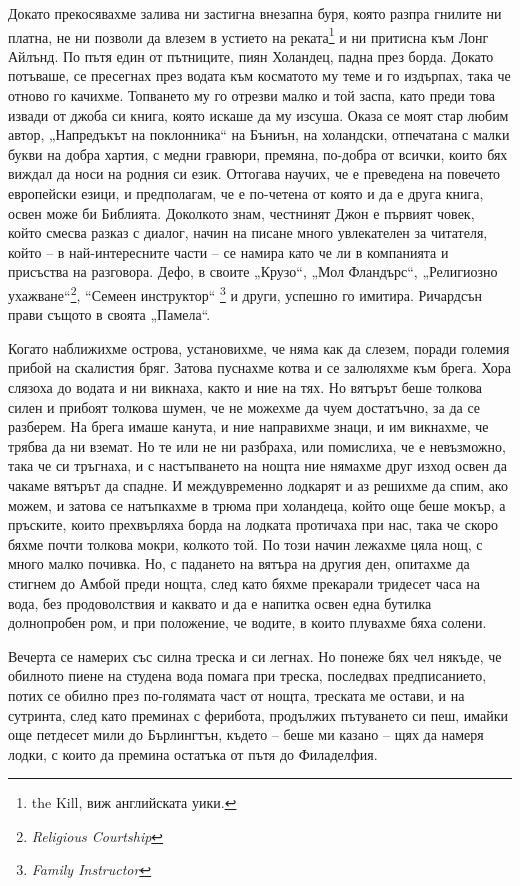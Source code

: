 \documentclass[12pt]{book}
\begin{document}
Докато прекосявахме залива ни застигна внезапна буря, която разпра гнилите ни платна, не ни позволи да влезем в устието на реката\footnote{the Kill, виж английската уики.} и ни притисна към Лонг Айлънд. По пътя един от пътниците, пиян Холандец, падна през борда. Докато потъваше, се пресегнах през водата към косматото му теме и го издърпах, така че отново го качихме. Топването му го отрезви малко и той заспа, като преди това извади от джоба си книга, която искаше да му изсуша. Оказа се моят стар любим автор, „Напредъкът на поклонника“ на Бъниън, на холандски, отпечатана с малки букви на добра хартия, с медни гравюри, премяна, по-добра от всички, които бях виждал да носи на родния си език. Оттогава научих, че е преведена на повечето европейски езици, и предполагам, че е по-четена от която и да е друга книга, освен може би Библията. Доколкото знам, честнинят Джон е първият човек, който смесва разказ с диалог, начин на писане много увлекателен за читателя, който – в най-интересните части – се намира като че ли в компанията и присъства на разговора. Дефо, в своите „Крузо“, „Мол Фландърс“, „Религиозно ухажване“\footnote{\textit{Religious Courtship}}, “Семеен инструктор“ \footnote{\textit{Family Instructor}} и други, успешно го имитира. Ричардсън прави същото в своята „Памела“.

Когато наближихме острова, установихме, че няма как да слезем, поради големия прибой на скалистия бряг. Затова пуснахме котва и се залюляхме към брега. Хора слязоха до водата и ни викнаха, както и ние на тях. Но вятърът беше толкова силен и прибоят толкова шумен, че не можехме да чуем достатъчно, за да се разберем. На брега имаше канута, и ние направихме знаци, и им викнахме, че трябва да ни вземат. Но те или не ни разбраха, или помислиха, че е невъзможно, така че си тръгнаха, и с настъпването на нощта ние нямахме друг изход освен да чакаме вятърът да спадне. И междувременно лодкарят и аз решихме да спим, ако можем, и затова се натъпкахме в трюма при холандеца, който още беше мокър, а пръските, които прехвърляха борда на лодката протичаха при нас, така че скоро бяхме почти толкова мокри, колкото той. По този начин лежахме цяла нощ, с много малко почивка. Но, с падането на вятъра на другия ден, опитахме да стигнем до Амбой преди нощта, след като бяхме прекарали тридесет часа на вода, без продоволствия и каквато и да е напитка освен една бутилка долнопробен ром, и при положение, че водите, в които плувахме бяха солени. 

Вечерта се намерих със силна треска и си легнах. Но понеже бях чел някъде, че обилното пиене на студена вода помага при треска, последвах предписанието, потих се обилно през по-голямата част от нощта, треската ме остави, и на сутринта, след като преминах с ферибота, продължих пътуването си пеш, имайки още петдесет мили до Бърлингтън, където – беше ми казано – щях да намеря лодки, с които да премина остатъка от пътя до Филаделфия. 
\end{document}
